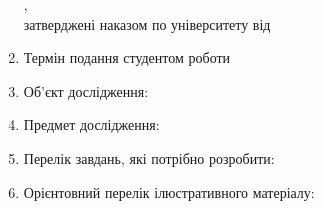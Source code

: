 \begin{spacing}{1.1}
\begin{enumerate}[label*=\arabic*., labelindent=0pt, itemindent=0cm]
	\noindent{},\vspace{-3mm}\\

	\noindent затверджені наказом по університету від \@univapproved
	\item Термін подання студентом роботи \@submission
	\item Об’єкт дослідження: \@searchobject
	\item Предмет дослідження: \@predmet
	\item Перелік завдань, які потрібно розробити: \@tasks
	\item Орієнтовний перелік ілюстративного матеріалу: \@illustrations

\end{enumerate}



\restoregeometry


\end{spacing}
